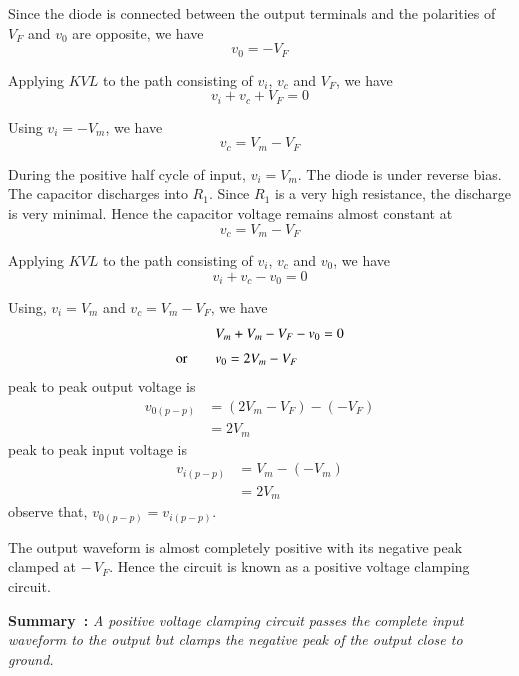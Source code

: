Since the diode is connected between the output terminals and the polarities of $V_{F}$ and $v_{0}$ are opposite, we have
\begin{equation}
v_{0}=-V_{F}\label{eq2.136}
\end{equation}

Applying $KVL$ to the path consisting of $v_{i}$, $v_{c}$ and $V_{F}$, we have
\begin{equation}
v_{i}+v_{c}+V_{F}=0\label{eq2.137}
\end{equation}

Using $v_{i}=-V_{m}$, we have
\begin{equation}
v_{c}=V_{m}-V_{F}\label{eq2.138}
\end{equation}

During the positive half cycle of input, $v_{i}=V_{m}$. The diode is under reverse bias. The capacitor discharges into $R_{1}$. Since $R_{1}$ is a very high resistance, the discharge is very minimal. Hence the capacitor voltage remains almost constant at
\begin{equation}
v_{c}=V_{m}-V_{F}\label{eq2.139}
\end{equation}

Applying $KVL$ to the path consisting of $v_{i}$, $v_{c}$ and $v_{0}$, we have
$$
v_{i}+v_{c}-v_{0}=0
$$

Using, $v_{i}=V_{m}$ and $v_{c}=V_{m}-V_{F}$, we have
\begin{align}
& V_{m}+V_{m}-V_{F}-v_{0}=0\notag\\[3pt]
\text{or}\qquad & v_{0}=2V_{m}-V_{F}\label{eq2.140}
\end{align}
peak to peak output voltage is
\begin{align*}
v_{0(p-p)} &= (2V_{m}-V_{F})-(-V_{F})\\[3pt]
           &= 2V_{m}
\end{align*}
peak to peak input voltage is
\begin{align*}
v_{i(p-p)} &= V_{m}-(-V_{m})\\[3pt]
           &= 2V_{m}
\end{align*}
observe that,\hspace{3.1cm} $v_{0(p-p)}=v_{i(p-p)}$.

The output waveform is almost completely positive with its negative peak clamped at $-\,V_{F}$. Hence the circuit is known as a positive voltage clamping circuit.

\medskip
\noindent
{\bf Summary~:} {\em A positive voltage clamping circuit passes the complete input waveform to the output but clamps the negative peak of the output close to ground.}

